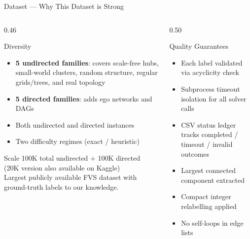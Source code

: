 \documentclass[aspectratio=169,10pt]{beamer}
\renewcommand{\footnotesize}{\tiny}
\begin{document}
\begin{frame}{Dataset — Why This Dataset is Strong}
  \begin{columns}[T]
    \begin{column}{0.46\textwidth}
      \begin{block}{Diversity}
        \begin{itemize}\setlength\itemsep{2pt}
          \item \textbf{5 undirected families}: covers scale-free hubs,
            small-world clusters, random structure,
            regular grids/trees, and real topology
          \item \textbf{5 directed families}: adds ego networks and DAGs
          \item Both undirected and directed instances
          \item Two difficulty regimes (exact / heuristic)
        \end{itemize}
      \end{block}
      \vspace{4pt}
      \begin{block}{Scale}
        100K total undirected + 100K directed\\
        {\footnotesize (20K version also available on Kaggle)}\\[4pt]
        Largest publicly available FVS dataset
        with ground-truth labels to our knowledge.
      \end{block}
    \end{column}
    \begin{column}{0.50\textwidth}
      \begin{block}{Quality Guarantees}
        \begin{itemize}\setlength\itemsep{2pt}
          \item Each label validated via acyclicity check
          \item Subprocess timeout isolation for all solver calls
          \item CSV status ledger tracks
            completed / timeout / invalid outcomes
          \item Largest connected component extracted
          \item Compact integer relabelling applied
          \item No self-loops in edge lists
        \end{itemize}
      \end{block}
      \vspace{4pt}
      \begin{tcolorbox}[greenbox,fontupper=\footnotesize]

\end{tcolorbox}
\end{column}
\end{columns}
\end{frame}
\end{document}
